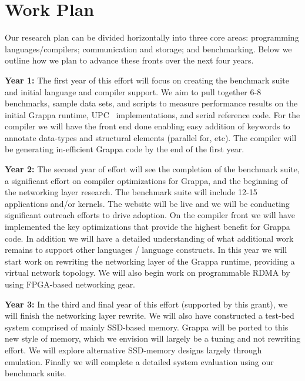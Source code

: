 \section{Work Plan}
\label{sec:plan}

Our research plan can be divided horizontally into three core areas: programming languages/compilers; communication and storage; and benchmarking. Below we outline how we plan to advance these fronts over the next four years.

\vspace{2ex}


\noindent\textbf{Year 1:} The first year of this effort will focus on creating the benchmark suite and initial language and compiler support.  We aim to pull together 6-8 benchmarks, sample data sets, and scripts to measure performance results on the initial Grappa runtime, UPC~\cite{upc:2005} implementations, and serial reference code.  For the compiler we will have the front end done enabling easy addition of keywords to annotate data-types and structural elements (parallel for, etc).  The compiler will be generating in-efficient Grappa code by the end of the first year.

\vspace{1ex}
\noindent\textbf{Year 2:} The second year of effort will see the completion of the benchmark suite, a significant effort on compiler optimizations for Grappa, and the beginning of the networking layer research.  The benchmark suite will include 12-15 applications and/or kernels.  The website will be live and we will be conducting significant outreach efforts to drive adoption.  On the compiler front we will have implemented the key optimizations that provide the highest benefit for Grappa code.  In addition we will have a detailed understanding of what additional work remains to support other languages / language constructs.  In this year we will start work on rewriting the networking layer of the Grappa runtime, providing a virtual network topology.  We will also begin work on programmable RDMA by using FPGA-based networking gear.


\vspace{1ex}
\noindent\textbf{Year 3:} In the third and final year of this effort (supported by this grant), we will finish the networking layer rewrite.  We will also have constructed a test-bed system comprised of mainly SSD-based memory.  Grappa will be ported to this new style of memory, which we envision will largely be a tuning and not rewriting effort.  We will explore alternative SSD-memory designs largely through emulation.  Finally we will complete a detailed system evaluation using our benchmark suite.

